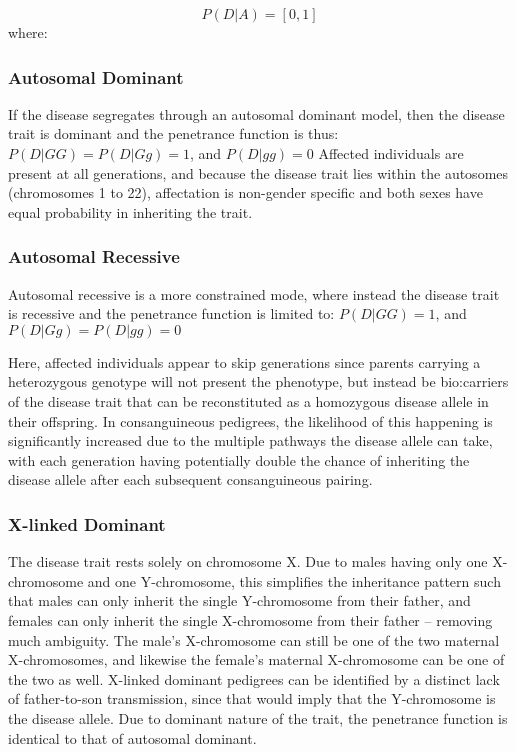 \begin{equation}
P (D | A) = [0,1]
\end{equation}
where:
\begin{description}
\end{description}


\subsubsection{Autosomal Dominant}

If the disease segregates through an autosomal dominant model, then the disease trait is dominant and the penetrance function is thus:  \(P(D|GG) = P(D|Gg) = 1\), and \(P(D|gg)=0\)
Affected individuals are present at all generations, and because the disease trait lies within the autosomes (chromosomes 1 to 22), affectation is non-gender specific and both sexes have equal probability in inheriting the trait.

\subsubsection{Autosomal Recessive}

Autosomal recessive is a more constrained mode, where instead the disease trait is recessive and the penetrance function is limited to: \(P(D|GG)=1\), and \(P(D|Gg) = P(D|gg) = 0\)

Here, affected individuals appear to skip generations since parents carrying a heterozygous genotype will not present the phenotype, but instead be \gls{bio:carriers} of the disease trait that can be reconstituted as a homozygous disease allele in their offspring. In consanguineous pedigrees, the likelihood of this happening is significantly increased due to the multiple pathways the disease allele can take, with each generation having potentially double the chance of inheriting the disease allele after each subsequent consanguineous pairing.

\subsubsection{X-linked Dominant}

The disease trait rests solely on chromosome X.  Due to males having only one X-chromosome and one Y-chromosome, this simplifies the inheritance pattern such that males can only inherit the single Y-chromosome from their father, and females can only inherit the single  X-chromosome from their father – removing much ambiguity. The male's X-chromosome can still be one of the two maternal X-chromosomes, and likewise the female's maternal X-chromosome can be one of the two as well.  X-linked dominant pedigrees can be identified by a distinct lack of father-to-son transmission, since that would imply that the Y-chromosome is the disease allele. Due to dominant nature of the trait, the penetrance function is identical to that of autosomal dominant.

